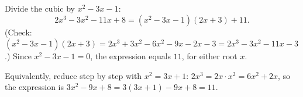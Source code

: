 Divide the cubic by $x^2-3x-1$:
\[
2x^3-3x^2-11x+8=\left(x^2-3x-1\right)(2x+3)+11 .
\]
(Check: $\left(x^2-3x-1\right)(2x+3)=2x^3+3x^2-6x^2-9x-2x-3=2x^3-3x^2-11x-3$.) Since $x^2-3x-1=0$, the expression equals $\boxed{11}$, for either root $x$.

Equivalently, reduce step by step with $x^2=3x+1$: $2x^3=2x\cdot x^2=6x^2+2x$, so the expression is $3x^2-9x+8=3\left(3x+1\right)-9x+8=11$.
